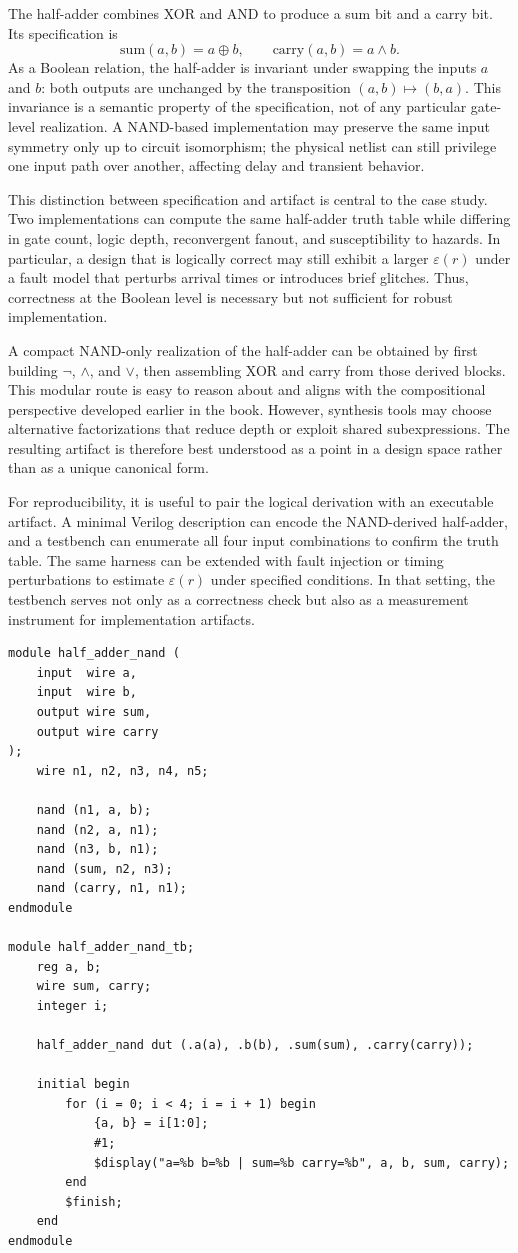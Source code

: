 The half-adder combines XOR and AND to produce a sum bit and a carry bit. Its specification is
\[
\mathrm{sum}(a,b) = a \oplus b,
\qquad
\mathrm{carry}(a,b) = a \wedge b.
\]
As a Boolean relation, the half-adder is invariant under swapping the inputs \(a\) and \(b\): both outputs are unchanged by the transposition \((a,b) \mapsto (b,a)\). This invariance is a semantic property of the specification, not of any particular gate-level realization. A NAND-based implementation may preserve the same input symmetry only up to circuit isomorphism; the physical netlist can still privilege one input path over another, affecting delay and transient behavior.

This distinction between specification and artifact is central to the case study. Two implementations can compute the same half-adder truth table while differing in gate count, logic depth, reconvergent fanout, and susceptibility to hazards. In particular, a design that is logically correct may still exhibit a larger \(\varepsilon(r)\) under a fault model that perturbs arrival times or introduces brief glitches. Thus, correctness at the Boolean level is necessary but not sufficient for robust implementation.

A compact NAND-only realization of the half-adder can be obtained by first building \(\neg\), \(\wedge\), and \(\vee\), then assembling XOR and carry from those derived blocks. This modular route is easy to reason about and aligns with the compositional perspective developed earlier in the book. However, synthesis tools may choose alternative factorizations that reduce depth or exploit shared subexpressions. The resulting artifact is therefore best understood as a point in a design space rather than as a unique canonical form.

For reproducibility, it is useful to pair the logical derivation with an executable artifact. A minimal Verilog description can encode the NAND-derived half-adder, and a testbench can enumerate all four input combinations to confirm the truth table. The same harness can be extended with fault injection or timing perturbations to estimate \(\varepsilon(r)\) under specified conditions. In that setting, the testbench serves not only as a correctness check but also as a measurement instrument for implementation artifacts.

\begin{verbatim}
module half_adder_nand (
    input  wire a,
    input  wire b,
    output wire sum,
    output wire carry
);
    wire n1, n2, n3, n4, n5;

    nand (n1, a, b);
    nand (n2, a, n1);
    nand (n3, b, n1);
    nand (sum, n2, n3);
    nand (carry, n1, n1);
endmodule

module half_adder_nand_tb;
    reg a, b;
    wire sum, carry;
    integer i;

    half_adder_nand dut (.a(a), .b(b), .sum(sum), .carry(carry));

    initial begin
        for (i = 0; i < 4; i = i + 1) begin
            {a, b} = i[1:0];
            #1;
            $display("a=%b b=%b | sum=%b carry=%b", a, b, sum, carry);
        end
        $finish;
    end
endmodule
\end{verbatim}

